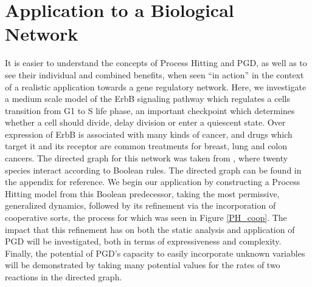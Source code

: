 \documentclass{article}
\begin{document}
\section{Application to a Biological Network}\label{bio_application}

It is easier to understand the concepts of Process Hitting and PGD, as well as to see their individual and combined benefits, when seen ``in action'' in the context of a realistic application towards a gene regulatory network. Here, we investigate a medium scale model of the ErbB signaling pathway which regulates a cells transition from G1 to S life phase, an important checkpoint which determines whether a cell should divide, delay division or enter a quiescent state. Over expression of ErbB is associated with many kinds of cancer, and drugs which target it and its receptor are common treatments for breast, lung and colon cancers. The directed graph for this network was taken from \cite{Sahin09}, where twenty species interact according to Boolean rules. The directed graph can be found in the appendix for reference. We begin our application by constructing a Process Hitting model from this Boolean predecessor, taking the most permissive, generalized dynamics, followed by its refinement via the incorporation of cooperative sorts, the process for which was seen in Figure \ref{PH_coop}. The impact that this refinement has on both the static analysis and application of PGD will be investigated, both in terms of expressiveness and complexity. Finally, the potential of PGD's capacity to easily incorporate unknown variables will be demonstrated by taking many potential values for the rates of two reactions in the directed graph.\\
\end{document}
